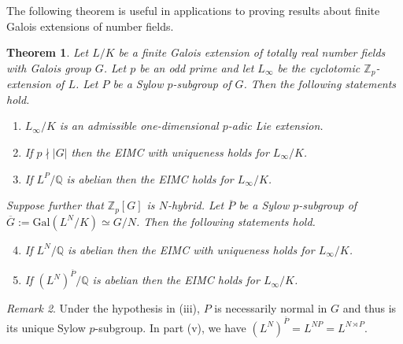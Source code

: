 \documentclass[12pt]{amsart}
\theoremstyle{plain}
\newtheorem{theorem}{Theorem}[section]
\theoremstyle{remark}
\newtheorem{remark}[theorem]{Remark}
\theoremstyle{definition}
\numberwithin{equation}{section}
\begin{document}
The following theorem is useful in applications to proving results about finite Galois extensions of number fields.

\begin{theorem}\label{thm:EIMC-start-with-num-fields}
Let $L/K$ be a finite Galois extension of totally real number fields with Galois group $G$.
Let $p$ be an odd prime and let $L_{\infty}$ be the cyclotomic ${\mathbb{Z}}_{p}$-extension of $L$.
Let $P$ be a Sylow $p$-subgroup of $G$. Then the following statements hold.
\begin{enumerate}
\item $L_{\infty}/K$ is an admissible one-dimensional $p$-adic Lie extension.
\item If $p \nmid |G|$ then the EIMC with uniqueness holds for $L_{\infty}/K$.
\item If $L^{P}/{\mathbb{Q}}$ is abelian then the EIMC holds for $L_{\infty}/K$.
\end{enumerate}
Suppose further that ${\mathbb{Z}}_{p}[G]$ is $N$-hybrid.
Let $\overline{P}$ be a Sylow $p$-subgroup of $\overline{G}:={\mathrm{Gal}}(L^{N}/K) \simeq G/N$.
Then the following statements hold.
\begin{enumerate}
\setcounter{enumi}{3}
\item If $L^{N}/{\mathbb{Q}}$ is abelian then the EIMC with uniqueness holds for $L_{\infty}/K$.
\item If $(L^{N})^{\overline{P}}/{\mathbb{Q}}$ is abelian then the EIMC holds for $L_{\infty}/K$.
\end{enumerate}
\end{theorem}

\begin{remark}
Under the hypothesis in (iii), $P$ is necessarily normal in $G$ and thus is its unique
Sylow $p$-subgroup. In part (v), we have $(L^{N})^{\overline{P}}=L^{NP}=L^{N \rtimes P}$.
\end{remark}
\end{document}
